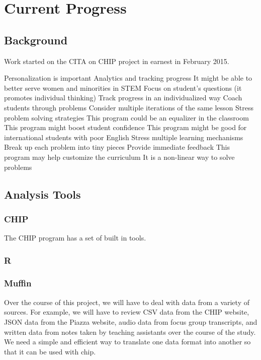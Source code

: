 \chapter[Chapter 4: Current Progress]{Current Progress}

\section{Background}

Work started on the CITA on CHIP project in earnest in February 2015.

Personalization is important
Analytics and tracking progress
It might be able to better serve women and minorities in STEM
Focus on student’s questions (it promotes individual thinking)
Track progress in an individualized way
Coach students through problems
Consider multiple iterations of the same lesson
Stress problem solving strategies
This program could be an equalizer in the classroom
This program might boost student confidence
This program might be good for international students with poor English
Stress multiple learning mechanisms
Break up each problem into tiny pieces
Provide immediate feedback
This program may help customize the curriculum
It is a non-linear way to solve problems

\section{Analysis Tools}

\subsection{CHIP}

The CHIP program has a set of built in tools.

\subsection{R}

\subsection{Muffin}

Over the course of this project, we will have to deal with data from a variety of sources. For example, we will have to review CSV data from the CHIP website, JSON data from the Piazza website, audio data from focus group transcripts, and written data from notes taken by teaching assistants over the course of the study. We need a simple and efficient way to translate one data format into another so that it can be used with \gls{chip}.

